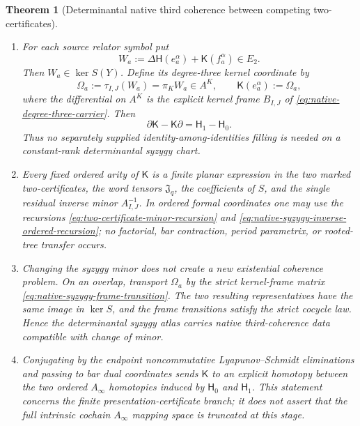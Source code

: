 \documentclass[11pt]{article}
\newtheorem{theorem}{Theorem}[section]
\theoremstyle{definition}
\begin{document}
\begin{theorem}[Determinantal native third coherence between competing two-certificates]
\begin{enumerate}[label=\textnormal{(\roman*)}]
\item For each source relator symbol put
\begin{equation}\label{eq:native-third-relation-cycle}
 W_a
 :=\Delta\mathsf H(e_a^\alpha)
   +\mathsf K(f_a^\alpha)\in E_2.
\end{equation}
Then $W_a\in\ker S(Y)$.  Define its degree-three kernel coordinate by
\begin{equation}\label{eq:native-third-relation-filling}
 \Omega_a:=\tau_{I,J}(W_a)=\pi_KW_a\in A^K,
 \qquad
 \mathsf K(e_a^\alpha):=\Omega_a,
\end{equation}
where the differential on $A^K$ is the explicit kernel frame
$B_{I,J}$ of \eqref{eq:native-degree-three-carrier}.  Then
\begin{equation}\label{eq:native-third-homotopy-equation}
 \boxed{
 \partial\mathsf K-\mathsf K\partial
 =\mathsf H_1-\mathsf H_0.
 }
\end{equation}
Thus no separately supplied identity-among-identities filling is needed on a
constant-rank determinantal syzygy chart.

\item Every fixed ordered arity of $\mathsf K$ is a finite planar expression
in the two marked two-certificates, the word tensors $\mathfrak J_q$, the
coefficients of $S$, and the single residual inverse minor
$A_{I,J}^{-1}$.  In ordered formal coordinates one may use the recursions
\eqref{eq:two-certificate-minor-recursion} and
\eqref{eq:native-syzygy-inverse-ordered-recursion}; no factorial, bar
contraction, period parametrix, or rooted-tree transfer occurs.

\item Changing the syzygy minor does not create a new existential coherence
problem.  On an overlap, transport $\Omega_a$ by the strict kernel-frame
matrix \eqref{eq:native-syzygy-frame-transition}.  The two resulting
representatives have the same image in $\ker S$, and the frame transitions
satisfy the strict cocycle law.  Hence the determinantal syzygy atlas carries
native third-coherence data compatible with change of minor.

\item Conjugating by the endpoint noncommutative Lyapunov--Schmidt
eliminations and passing to bar dual coordinates sends $\mathsf K$ to an
explicit homotopy between the two ordered $A_\infty$ homotopies induced by
$\mathsf H_0$ and $\mathsf H_1$.  This statement concerns the finite
presentation-certificate branch; it does not assert that the full intrinsic
cochain $A_\infty$ mapping space is truncated at this stage.
\end{enumerate}
\end{theorem}
\end{document}
